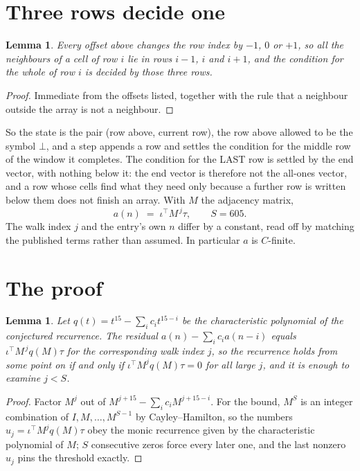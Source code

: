 \documentclass[11pt,a4paper]{article}
\theoremstyle{plain}
\newtheorem{lemma}[theorem]{Lemma}
\theoremstyle{definition}
\begin{document}
\section{Three rows decide one}

\begin{lemma}\label{lem:win}
Every offset above changes the row index by $-1$, $0$ or $+1$, so all the neighbours of a cell
of row $i$ lie in rows $i-1$, $i$ and $i+1$, and the condition for the whole of row $i$ is
decided by those three rows.
\end{lemma}

\begin{proof}
Immediate from the offsets listed, together with the rule that a neighbour outside the array is
not a neighbour.
\end{proof}

So the state is the pair (row above, current row), the row above allowed to be the symbol
$\bot$, and a step appends a row and settles the condition for the middle row of the window it
completes. The condition for the LAST row is settled by the end vector, with nothing below it:
the end vector is therefore not the all-ones vector, and a row whose cells find what they need
only because a further row is written below them does not finish an array. With $M$ the
adjacency matrix,
\[
a(n)\;=\;\iota^{\!\top}M^{\,j}\tau ,\qquad S=605.
\]
The walk index $j$ and the entry's own $n$ differ by a constant, read off by matching the
published terms rather than assumed. In particular $a$ is $C$-finite.

\section{The proof}

\begin{lemma}\label{lem:crit}
Let $q(t)=t^{15}-\sum_i c_it^{15-i}$ be the characteristic polynomial of the
conjectured recurrence. The residual $a(n)-\sum_ic_ia(n-i)$ equals
$\iota^{\!\top}M^{\,j}q(M)\tau$ for the corresponding walk index $j$, so the recurrence
holds from some point on if and only if $\iota^{\!\top}M^{j}q(M)\tau=0$ for all large $j$,
and it is enough to examine $j<S$.
\end{lemma}

\begin{proof}
Factor $M^{j}$ out of $M^{j+15}-\sum_ic_iM^{j+15-i}$. For the bound, $M^{S}$
is an integer combination of $I,M,\dots,M^{S-1}$ by Cayley--Hamilton, so the numbers
$u_j=\iota^{\!\top}M^{j}q(M)\tau$ obey the monic recurrence given by the characteristic
polynomial of $M$; $S$ consecutive zeros force every later one, and the last nonzero $u_j$
pins the threshold exactly.
\end{proof}
\end{document}

